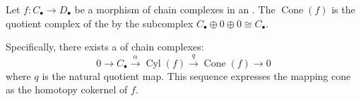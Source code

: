 \begin{lemma} \label{lemma:relation_between_mapping_cone_and_mapping_cylinder_of_chain_complexes}
Let $f: C_\bullet \to D_\bullet$ be a morphism of chain complexes in an . The  $\operatorname{Cone}(f)$ is the quotient complex of the  by the subcomplex $C_\bullet \oplus 0 \oplus 0 \cong C_\bullet$. 

Specifically, there exists a  of chain complexes:
$$ 0 \to C_\bullet \xrightarrow{\alpha} \operatorname{Cyl}(f) \xrightarrow{q} \operatorname{Cone}(f) \to 0 $$
where $q$ is the natural quotient map. This sequence expresses the mapping cone as the homotopy cokernel of $f$.
\end{lemma}